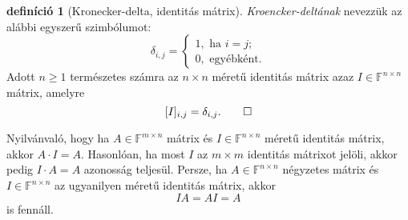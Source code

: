 \documentclass[a4paper, showtrims]{memoir}
\theoremstyle{plain}
\theoremstyle{remark}
\theoremstyle{definition}
\newtheorem{definition}[proposition]{definíció}
\begin{document}
\begin{definition}[Kronecker-delta, identitás mátrix]
	\emph{Kroencker-deltának} nevezzük az alábbi egyszerű szimbólumot:
	\[
		\delta_{i,j}=
		\begin{cases}
			1,\text{ ha }i=j; \\
			0,\text{ egyébként.}
		\end{cases}
	\]
	Adott $n\geq 1$ természetes számra az $n\times n$ méretű identitás mátrix azaz $I\in\mathbb{F}^{n\times n}$ mátrix,
	amelyre
	\[
		[I]_{i,j}=\delta_{i,j}.\qedhere
	\]
\end{definition}
Nyilvánvaló, hogy ha $A\in\mathbb{F}^{m\times n}$ mátrix és $I\in\mathbb{F}^{n\times n}$ méretű identitás mátrix,
akkor $A\cdot I=A$. Hasonlóan, ha most $I$ az $m\times m$ identitás mátrixot jelöli, akkor pedig $I\cdot A=A$ azonosság teljesül.
Persze, ha $A\in\mathbb{F}^{n\times n}$ négyzetes mátrix és $I\in\mathbb{F}^{n\times n}$ az ugyanilyen méretű identitás mátrix,
akkor
\[
	IA=AI=A
\]
is fennáll.
\end{document}
